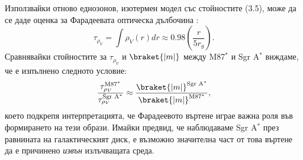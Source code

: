 \noindent\begin{minipage}{22em}
	Използвайки отново еднозонов, изотермен модел със стойностите (3.5), може да се даде оценка за Фарадеевата оптическа дълбочина \cite{EHT_SGR_VIII}:
	\begin{equation}
		\tau_{\rho_V} = \int \rho_{V}(r)dr\approx 0.98\left(\frac{r}{5r_g}\right).
	\end{equation}
	Сравнявайки стойностите за $\tau_{\rho_V}$ и $\braket{|m|}$ между M87$^*$ и Sgr A$^*$ виждаме, че е изпълнено следното условие:
	\begin{equation}
		\frac{\tau_{\rho_V}^{\text{M87}^*}}{\tau_{\rho_V}^{\text{Sgr A}^*}}\approx\frac{\braket{|m|}^{\text{Sgr A}^*}}{\braket{|m|}^{\text{M87}^*}},
	\end{equation}
	което подкрепя интерпретацията, че Фарадеевото въртене играе важна роля във формирането на тези образи. Имайки предвид, че наблюдаваме Sgr A$^*$ през равнината на галактическият диск, е възможно значителна част от това въртене да е причинено \emph{извън} излъчващата среда.
\end{minipage}$\,\,\,$

